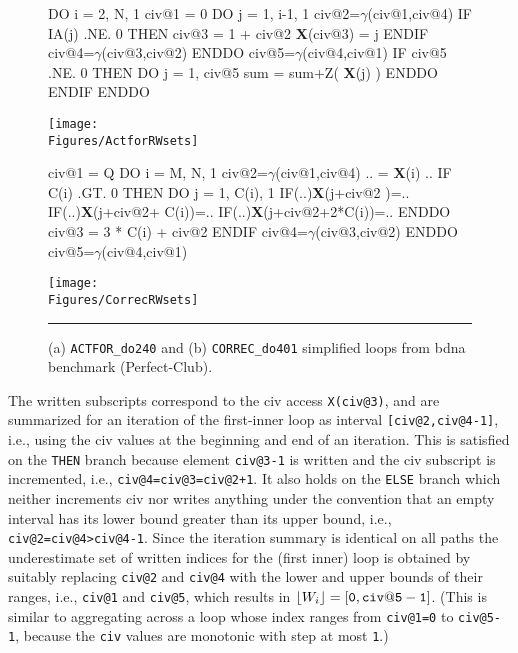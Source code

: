 \documentclass{sig-alternate}
\newcommand{\mymath}[1]{$ #1 $}
\newcommand{\Figures}[1]{../Figures/}
\begin{document}
\begin{figure}
\begin{minipage}{0.45\columnwidth}
\begin{colorcode}
DO i = 2, N, 1
 civ@1 = 0
 DO j = 1, i-1, 1
  civ@2=\mymath{\gamma}(civ@1,civ@4)
  IF IA(j) .NE. 0 THEN
   civ@3 = 1 + civ@2
   {\bf{}X}(civ@3) = j
  ENDIF
  civ@4=\mymath{\gamma}(civ@3,civ@2)
 ENDDO
 civ@5=\mymath{\gamma}(civ@4,civ@1)
 IF civ@5 .NE. 0 THEN
  DO j = 1, civ@5
   sum = sum+Z( {\bf{}X}(j) )
ENDDO ENDIF ENDDO
\end{colorcode}
\texttt{[image: \\Figures/ActforRWsets]} 
\end{minipage}
\begin{minipage}{0.48\columnwidth}
\begin{colorcode}
civ@1 = Q
DO i = M, N, 1
 civ@2=\mymath{\gamma}(civ@1,civ@4)
 .. = {\bf X}(i) ..
 IF C(i) .GT. 0 THEN
  DO j = 1, C(i), 1
   IF(..){\bf{}X}(j+civ@2       )=..
   IF(..){\bf{}X}(j+civ@2+  C(i))=..
   IF(..){\bf{}X}(j+civ@2+2*C(i))=..
  ENDDO
  civ@3 = 3 * C(i) + civ@2
 ENDIF
 civ@4=\mymath{\gamma}(civ@3,civ@2)
ENDDO
civ@5=\mymath{\gamma}(civ@4,civ@1)  
\end{colorcode}
\hspace{2ex}\texttt{[image: \\Figures/CorrecRWsets]} 
\end{minipage}
\hrule
\caption{(a) {\tt ACTFOR\_do240} and (b) {\tt CORREC\_do401} simplified loops 
            from {\sc bdna} benchmark ({\sc Perfect-Club}).}
\label{fig:codeActforCorrec}
\end{figure}


The written subscripts correspond to the {\sc civ} access {\tt X(civ@3)}, %
and are summarized for an iteration of the first-inner loop as
interval  {\tt[civ@2,civ@4-1]}, i.e., using the {\sc civ} values at 
the beginning and end of an iteration.
This is satisfied on the {\tt THEN} branch because element {\tt civ@3-1}
is written and the {\sc civ} subscript is incremented, i.e., 
{\tt civ@4=civ@3=civ@2+1}. It also holds on the {\tt ELSE} branch
which neither increments {\sc civ} nor writes anything under the convention 
that an empty interval has its lower bound greater than its upper bound,
i.e., {\tt civ@2=civ@4>civ@4-1}.
%
Since the iteration summary is identical on all paths the underestimate 
set of written indices for the (first inner) loop is obtained by suitably 
replacing {\tt civ@2} and {\tt civ@4} with the lower and upper bounds of 
their ranges, i.e., {\tt civ@1} and {\tt civ@5}, which results in 
$\lfloor W_i\rfloor={\tt [0,civ@5-1]}$.
(This is similar to aggregating across a loop whose index ranges 
    from {\tt{}civ@1=0} to {\tt{}civ@5-1}, because the {\tt civ} 
    values are monotonic with step at most {\tt 1}.)
\end{document}
